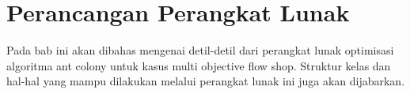 \chapter{Perancangan Perangkat Lunak}
\label{chap:perancangan}

	Pada bab ini akan dibahas mengenai detil-detil dari perangkat lunak optimisasi algoritma ant colony
	untuk kasus multi objective flow shop. Struktur kelas dan hal-hal yang mampu dilakukan  melalui perangkat 
	lunak ini juga akan dijabarkan.